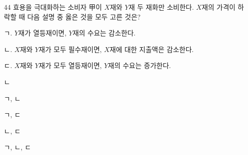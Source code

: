 \begin{question}{44}
효용을 극대화하는 소비자 甲이 $X$재와 $Y$재 두 재화만 소비한다. $X$재의 가격이 하락할 때 다음 설명 중 옳은 것을 모두 고른 것은?
\begin{framedtext}
ㄱ. $Y$재가 열등재이면, $Y$재의 수요는 감소한다. \par
ㄴ. $X$재와 $Y$재가 모두 필수재이면, $X$재에 대한 지출액은 감소한다. \par
ㄷ. $X$재와 $Y$재가 모두 열등재이면, $Y$재의 수요는 증가한다. \par
\end{framedtext}
\begin{choices}
  \item ㄴ
  \item ㄱ, ㄴ
  \item ㄱ, ㄷ
  \item ㄴ, ㄷ
  \item ㄱ, ㄴ, ㄷ
\end{choices}
\end{question}
\answerall
{}
